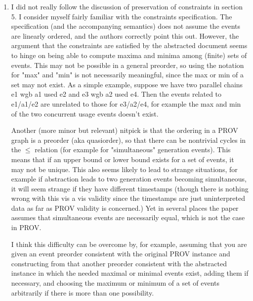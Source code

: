 \documentclass{article}
\newcommand{\showColour}{yes} %
\newcommand{\showComments}{yes} %
\newcommand{\note}[2]{\ifthenelse{\equal{\showColour}{yes}}{\textcolor{#1}{#2}}{#2}}
\newcommand{\jwb}[1]{\note{blue}{#1}}
\newcommand{\com}[2]{\ifthenelse{\equal{\showComments}{yes}}{\textcolor{#1}{#2}}{}}
\newcommand{\comment}[1]{\com{red}{#1}}
\begin{document}
\begin{enumerate}
\item I did not really follow the discussion of preservation of constraints in section 5.  I consider myself fairly familiar with the constraints specification.  The specification (and the accompanying semantics) does not assume the events are linearly ordered, and the authors correctly point this out.  However, the argument that the constraints are satisfied by the abstracted document seems to hinge on being able to compute maxima and minima among (finite) sets of events.  This may not be possible in a general preorder, so using the notation for "max" and "min" is not necessarily meaningful, since the max or min of a set may not exist. As a simple example, suppose we have two parallel chains e1 wgb a1 used e2 and e3 wgb a2 used e4.  Then the events related to e1/a1/e2 are unrelated to those for e3/a2/e4, for example the max and min of the two concurrent usage events doesn't exist.

\jwb{See answer to point 2 below.}



Another (more minor but relevant) nitpick is that the ordering in a PROV graph is a preorder (aka quasiorder), so that there can be nontrivial cycles in the $\leq$ relation (for example for "simultaneous" generation events).  This means that if an upper bound or lower bound exists for a set of events, it may not be unique.
This also seems likely to lead to strange situations, for example if abstraction leads to two generation events becoming simultaneous, it will seem strange if they have different timestamps (though there is nothing wrong with this vis a vis validity since the timestamps are just uninterpreted data as far as PROV validity is concerned.)  Yet in several places the paper assumes that simultaneous events are necessarily equal, which is not the case in PROV.

I think this difficulty can be overcome by, for example, assuming that you are given an event preorder consistent with the original PROV instance and constructing from that another preorder consistent with the abstracted instance in which the needed maximal or minimal events exist, adding them if necessary, and choosing the maximum or minimum of a set of events arbitrarily if there is more than one possibility.  



\end{enumerate}
\end{document}

